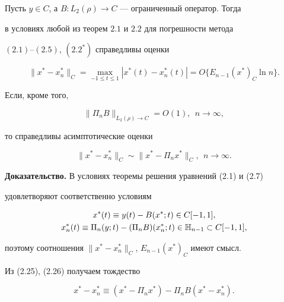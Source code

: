 \begin{thms}


Пусть $y\in C$, а $B:L_2(\rho)\to C$ --- ограниченный оператор. Тогда


в условиях любой из теорем $2.1$ и $2.2$ для погрешности метода


$(2.1)$--$(2.5)$, $(2.2^*)$ справедливы оценки


\begin{equation}


\|x^*-x_n^*\|_C=\max_{-1\le t \le 1}|x^*(t)-x_n^*(t)|=


O\{E_{n-1}(x^*)_C\ln n\}.


\end{equation}


Если, кроме того,


\begin{equation}


\|\Pi_nB\|_{L_2(\rho)\to C} = O(1),\ \ n\to \infty,


\end{equation}


то справедливы асимптотические оценки


\begin{equation}


\|x^*-x_n^*\|_C\sim \|x^*-\Pi_nx^*\|_C,\ \ n\to \infty.


\end{equation}


\end{thms}





{\bf Доказательство.} В условиях теоремы решения уравнений (2.1) и (2.7)


удовлетворяют соответственно условиям


\begin{gather}


x^*(t)\equiv y(t)-B(x^*;t)\in C[-1,1], \\


%


x_n^*(t)\equiv \Pi_n(y;t)-(\Pi_nB)(x^*_n;t)\in \Bbb H_{n-1}\subset C[-1,1],


\end{gather}


поэтому соотношения $\|x^*-x^*_n\|_C$, $E_{n-1}(x^*)_C$ имеют смысл.


Из (2.25), (2.26) получаем тождество


\begin{equation}


x^*-x^*_n \equiv (x^*-\Pi_nx^*)-\Pi_nB(x^*-x^*_n).


\end{equation}


